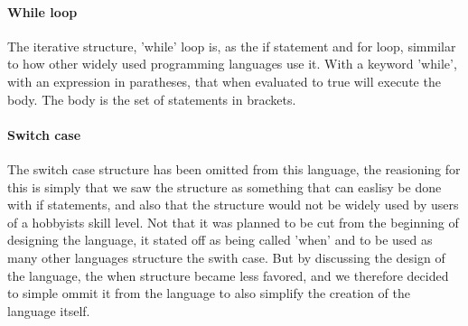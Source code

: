 \paragraph*{While loop}
The iterative structure, 'while' loop is, as the if statement and for loop, simmilar to how other widely used programming languages use it. With a keyword 'while', with an expression in paratheses, that when evaluated to true will execute the body. The body is the set of statements in brackets. 

\paragraph*{Switch case}
The switch case structure has been omitted from this language, the reasioning for this is simply that we saw the structure as something that can easlisy be done with if statements, and also that the structure would not be widely used by users of a hobbyists skill level. Not that it was planned to be cut from the beginning of designing the language, it stated off as being called 'when' and to be used as many other languages structure the swith case. But by discussing the design of the language, the when structure became less favored, and we therefore decided to simple ommit it from the language to also simplify the creation of the language itself. 
